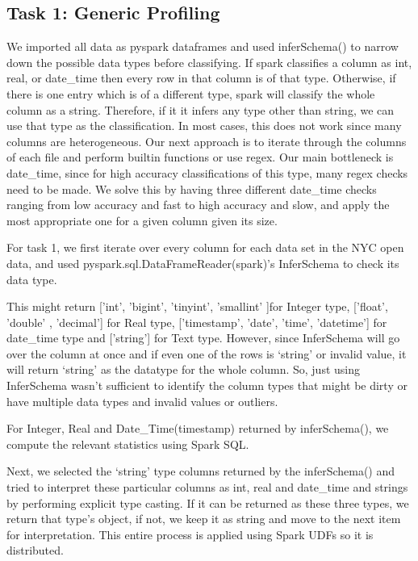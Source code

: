 \documentclass[sigconf,authordraft]{acmart}
\begin{document}
\subsection{Task 1: Generic Profiling}

We imported all data as pyspark dataframes and used inferSchema() to narrow down the possible data types before classifying. If spark classifies a column as int, real, or date\_time then every row in that column is of that type. Otherwise, if there is one entry which is of a different type, spark will classify the whole column as a string. Therefore, if it it infers any type other than string, we can use that type as the classification. In most cases, this does not work since many columns are heterogeneous. Our next approach is to iterate through the columns of each file and perform builtin functions or use regex. Our main bottleneck is date\_time, since for high accuracy classifications of this type, many regex checks need to be made. We solve this by having three different date\_time checks ranging from low accuracy and fast to high accuracy and slow, and apply the most appropriate one for a given column given its size.

For task 1, we first iterate over every column for each data set in the NYC open data, and used
pyspark.sql.DataFrameReader(spark)’s InferSchema to check its data type.


This might return ['int', 'bigint', 'tinyint', 'smallint' ]for Integer type, ['float', 'double' , 'decimal'] for
Real type, ['timestamp', 'date', 'time', 'datetime'] for date\_time type and ['string'] for Text type.
However, since InferSchema will go over the column at once and if even one of the rows is ‘string’
or invalid value, it will return ‘string’ as the datatype for the whole column. So, just using
InferSchema wasn’t sufficient to identify the column types that might be dirty or have multiple
data types and invalid values or outliers.

For Integer, Real and Date\_Time(timestamp) returned by inferSchema(), we compute the relevant
statistics using Spark SQL.

Next, we selected the ‘string’ type columns returned by the inferSchema() and tried to
interpret these particular columns as int, real and date\_time and strings by performing explicit type
casting. If it can be returned as these three types, we return that type’s object, if not, we keep it as
string and move to the next item for interpretation. This entire process is applied using Spark UDFs
so it is distributed. 
\end{document}

